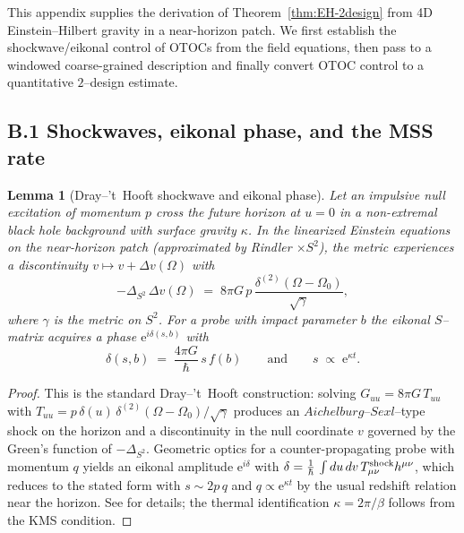 \documentclass[11pt,a4paper]{article}
\theoremstyle{plain}
\newtheorem{lemma}[theorem]{Lemma}
\theoremstyle{definition}
\theoremstyle{remark}
\begin{document}
This appendix supplies the derivation of Theorem~\ref{thm:EH-2design} from 4D Einstein--Hilbert gravity in a near-horizon patch.
We first establish the shockwave/eikonal control of OTOCs from the field equations, then pass to a windowed coarse-grained description and finally convert OTOC control to a quantitative $2$--design estimate.

\subsection*{B.1 Shockwaves, eikonal phase, and the MSS rate}
\begin{lemma}[Dray--'t~Hooft shockwave and eikonal phase]
\label{lem:shockwave}
Let an impulsive null excitation of momentum $p$ cross the future horizon at $u{=}0$ in a non-extremal black hole background with surface gravity $\kappa$.
In the linearized Einstein equations on the near-horizon patch (approximated by Rindler $\times S^2$), the metric experiences a discontinuity $v\mapsto v+\Delta v(\Omega)$ with
\[
-\Delta_{S^2}\,\Delta v(\Omega)\;=\;8\pi G\,p\,\frac{\delta^{(2)}(\Omega-\Omega_0)}{\sqrt{\gamma}}\!,
\]
where $\gamma$ is the metric on $S^2$.
For a probe with impact parameter $b$ the eikonal $S$--matrix acquires a phase $\mathrm{e}^{i\delta(s,b)}$ with
\[
\delta(s,b) \;=\; \frac{4\pi G}{\hbar}\,s\,f(b)
\qquad\text{and}\qquad s \;\propto\; \mathrm{e}^{\kappa t}.
\]
\end{lemma}
\begin{proof}
This is the standard Dray--'t~Hooft construction: solving $G_{uu}=8\pi G\,T_{uu}$ with $T_{uu}=p\,\delta(u)\,\delta^{(2)}(\Omega-\Omega_0)/\sqrt{\gamma}$ produces an $Aichelburg$--$Sexl$--type shock on the horizon and a discontinuity in the null coordinate $v$ governed by the Green's function of $-\Delta_{S^2}$.
Geometric optics for a counter-propagating probe with momentum $q$ yields an eikonal amplitude $\mathrm{e}^{i \delta}$ with $\delta=\frac{1}{\hbar}\,\int du\,dv\, T^{\rm shock}_{\mu\nu}h^{\mu\nu}$, which reduces to the stated form with $s\sim 2p\,q$ and $q\propto \mathrm{e}^{\kappa t}$ by the usual redshift relation near the horizon. See \cite{tHooft:1985} for details; the thermal identification $\kappa=2\pi/\beta$ follows from the KMS condition.
\end{proof}
\end{document}
